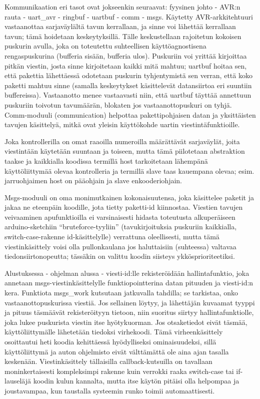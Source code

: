 \documentclass{article}
\newcommand{\kuvaa}[4]{%
	\begin{figure}[h]%
		\centering \texttt{[image: \#2]}%
		\caption{#3 \label{fig:#4}}%
	\end{figure}%
}
\begin{document}

Kommunikaation eri tasot ovat jokseenkin seuraavat: fyysinen johto - AVR:n rauta - uart\_avr - ringbuf - uartbuf - comm - msgs. Käytetty AVR-arkkitehtuuri vastaanottaa sarjaväylältä tavun kerrallaan, ja sinne voi lähettää kerrallaan tavun; tämä hoidetaan keskeytyksillä. Tälle keskustellaan rajoitetun kokoisen puskurin avulla, joka on toteutettu suhteellisen käyttöagnostisena rengaspuskurina (bufferia sisään, bufferia ulos). Puskuriin voi yrittää kirjoittaa pitkän viestin, josta sinne kirjoitetaan kaikki mitä mahtuu; uartbuf hoitaa sen, että pakettia lähettäessä odotetaan puskurin tyhjentymistä sen verran, että koko paketti mahtuu sinne (samalla keskeytykset käsittelevät datansiirtoa eri suuntiin buffereissa). Vastaanotto menee vastaavasti niin, että uartbuf täyttää annettuun puskuriin toivotun tavumäärän, blokaten jos vastaanottopuskuri on tyhjä. Comm-moduuli (communication) helpottaa pakettipohjaisen datan ja yksittäisten tavujen käsittelyä, mitkä ovat yleisin käyttökohde uartin viestintäfunktioille. 

Joka kontrollerilla on omat raaoilla numeroilla määrättävät sarjaväylät, joita viestintään käytetään suuntaan ja toiseen, mutta tämä piilotetaan abstraktion taakse ja kaikkialla koodissa termillä host tarkoitetaan lähempänä käyttöliittymää olevaa kontrolleria ja termillä slave taas kauempana olevaa; esim. jarruohjaimen host on pääohjain ja slave enkooderiohjain.

Msgs-moduuli on oma monimutkainen kokonaisuutensa, joka käsittelee paketit ja jakaa ne eteenpäin koodille, jota tietty paketti-id kiinnostaa. Viestien tavujen veivaaminen apufunktioilla ei varsinaisesti hidasta toteutusta alkuperäiseen arduino-sketchiin ``bruteforce-tyyliin'' (tavukirjoituksia puskuriin kaikkialla, switch-case-rakenne id-käsittelylle) verrattuna oleellisesti, mutta tämä viestinkäsittely voisi olla pullonkaulana jos haluttaisiin (suhteessa) valtavaa tiedonsiirtonopeutta; tässäkin on valittu koodin siisteys ykkösprioriteetiksi.

Alustuksessa - ohjelman alussa - viesti-id:lle rekisteröidään hallintafunktio, joka annetaan msgs-viestinkäsittelylle funktiopointterina datan pituuden ja viesti-id:n kera. Funktiota msgs\_work kutsutaan jatkuvalla tahdilla; se tarkistaa, onko vastaanottopuskurissa viestiä. Jos sellainen löytyy, ja lähettäjän kuvaamat tyyppi ja pituus täsmäävät rekisteröityyn tietoon, niin suoritus siirtyy hallintafunktiolle, joka lukee puskurista viestin itse hyötykuorman. Jos otsaketiedot eivät täsmää, käyttöliittymälle lähetetään tiedoksi virhekoodi. Tämä virheenkäsittely osoittautui heti koodia kehittäessä hyödylliseksi ominaisuudeksi, sillä käyttöliittymä ja auton ohjelmisto eivät välttämättä ole aina ajan tasalla keskenään. Viestinkäsittely tällaisilla callback-kutsuilla on tavallaan moninkertaisesti kompleksimpi rakenne kuin verrokki raaka switch-case tai if-lauseläjä koodin kulun kannalta, mutta itse käytön pitäisi olla helpompaa ja joustavampaa, kun taustalla systeemin runko toimii automaattisesti.
\end{document}
